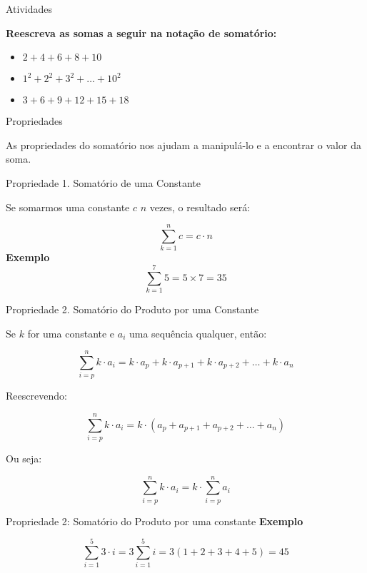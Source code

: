 \documentclass{beamer} %
\begin{document}
\begin{frame}{Atividades}
    
\textbf{Reescreva as somas a seguir na notação de somatório:}
    \begin{itemize}
        \item $ 2 + 4 + 6 + 8 + 10 $
        \item $ 1^2 + 2^2 + 3^2 + \dots + 10^2 $
        \item $ 3 + 6 + 9 + 12 + 15 + 18 $
    \end{itemize}
\end{frame}

\begin{frame}{Propriedades}
    
As propriedades do somatório nos ajudam a manipulá-lo e a encontrar o valor da soma.

\end{frame}

\begin{frame}{Propriedade 1. Somatório de uma Constante}
	
	Se somarmos uma constante \( c \) \( n \) vezes, o resultado será:
	
	\[
	\sum_{k=1}^{n} c = c \cdot n
	\]
	\textbf{Exemplo}  
	\[
	\sum_{k=1}^{7} 5 = 5 \times 7 = 35
	\]
\end{frame}

\begin{frame}{Propriedade 2. Somatório do Produto por uma Constante}
	
	Se \( k \) for uma constante e \( a_i \) uma sequência qualquer, então:
	
	\[
	\sum_{i=p}^{n} k \cdot a_i = k \cdot a_p + k \cdot a_{p+1} + k \cdot a_{p+2} + \dots + k \cdot a_n
	\]
	
	Reescrevendo:
	
	\[
	\sum_{i=p}^{n} k \cdot a_i = k \cdot \left( a_p + a_{p+1} + a_{p+2} + \dots + a_n \right)
	\]
	
	Ou seja:
	
	\[
	\sum_{i=p}^{n} k \cdot a_i = k \cdot \sum_{i=p}^{n} a_i
	\]

\end{frame}    
	
\begin{frame}{Propriedade 2: Somatório do Produto por uma constante}
	\textbf{Exemplo}  
    
	\[
	\sum_{i=1}^{5} 3 \cdot i = 3 \sum_{i=1}^{5} i = 3(1+2+3+4+5)=45
	\]

    \end{frame}
	
\end{document}
